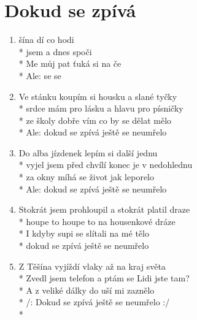 \section{Dokud se zpívá} %
\begin{enumerate}
\item {}šína dí  co hodi    \\*
 jsem  a  dnes spoči    \\*
 Me můj pat ťuká si na če  \\*
Ale:  se   se    
\item Ve stánku koupím si housku a slané tyčky \\*
srdce mám pro lásku a hlavu pro písničky \\*
ze školy dobře vím co by se dělat mělo \\*
Ale: dokud se zpívá ještě se neumřelo 
\item Do alba jízdenek lepím si další jednu \\*
vyjel jsem před chvílí konec je v nedohlednu \\*
za okny míhá se život jak leporelo \\*
Ale: dokud se zpívá ještě se neumřelo 
\item Stokrát jsem prohloupil a stokrát platil draze \\*
houpe to houpe to na housenkové dráze \\*
I kdyby supi se slítali na mé tělo \\*
dokud se zpívá ještě se neumřelo 
\item Z Těšína vyjíždí vlaky až na kraj světa \\*
Zvedl jsem telefon a ptám se Lidi jste tam? \\*
A z veliké dálky do uší mi zaznělo \\*
/: Dokud se zpívá ještě se neumřelo :/ \\*
\end{enumerate}
